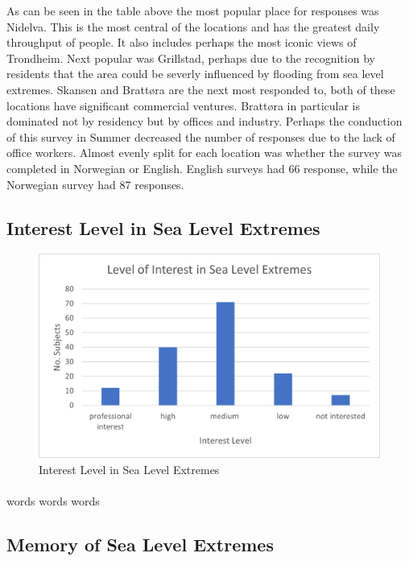 As can be seen in the table above the most popular place for responses was Nidelva. This is the most central of the locations and has  the greatest daily throughput of people. It also includes perhaps the most iconic views of Trondheim. Next popular was Grillstad, perhaps due to the recognition by residents that the area could be severly influenced by flooding from sea level extremes. Skansen and Brattøra are the next most responded to, both of these locations have significant commercial ventures. Brattøra in particular is dominated not by residency but by offices and industry. Perhaps the conduction of this survey in Summer decreased the number of responses due to the lack of office workers. 
Almost evenly split for each location was whether the survey was completed in Norwegian or English. English surveys had 66 response, while the Norwegian survey had 87 responses.  

\subsection{Interest Level in Sea Level Extremes}

\begin{figure}[h]
    \centering
    \includegraphics{fig_results/interest-level.png}
    \caption{Interest Level in Sea Level Extremes}
    \label{fig:my_label}
\end{figure}
\paragraph{}
words words words


\subsection{Memory of Sea Level Extremes}

